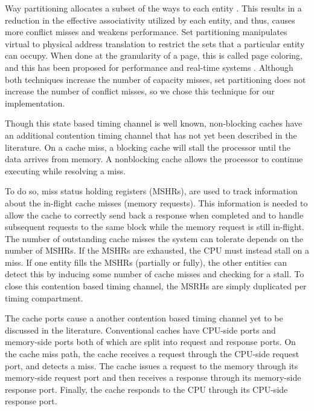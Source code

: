 Way partitioning allocates a subset of the ways to each entity 
\cite{citation_needed}. This results in a reduction in the effective 
associativity utilized by each entity, and thus, causes more conflict misses 
and weakens performance. Set partitioning manipulates virtual to physical 
address translation to restrict the sets that a particular entity can occupy.  
When done at the granularity of a page, this is called page coloring, and this 
has been proposed for performance \cite{citation_needed} and real-time systems 
\cite{rtas_cache_framework}.  Although both techniques increase the number of 
capacity misses, set partitioning does not increase the number of conflict 
misses, so we chose this technique for our implementation.

Though this state based timing channel is well known, non-blocking caches have 
an additional contention timing channel that has not yet been described in the 
literature. On a cache miss, a blocking cache will stall the processor until 
the data arrives from memory. A nonblocking cache allows the processor to 
continue executing while resolving a miss.

To do so, miss status holding registers (MSHRs), are used to track information 
about the in-flight cache misses (memory requests). This information is  needed 
to allow the cache to correctly send back a response when completed and to 
handle subsequent requests to the same block while the memory request is still 
in-flight.
The number of outstanding cache misses the system can tolerate depends on the 
number of MSHRs. If the MSHRs are exhausted, the CPU must instead stall on a 
miss. If one entity fills the MSHRs (partially or fully), the other entities 
can detect this by inducing some number of cache misses and checking for a 
stall. To close this contention based timing channel, the MSRHs are simply 
duplicated per timing compartment.

The cache ports cause a another contention based timing channel yet to be 
discussed in the literature. Conventional caches have CPU-side ports and 
memory-side ports both of which are split into request and response ports. On 
the cache miss path, the cache receives a request through the CPU-side request 
port, and detects a miss. The cache issues a request to the memory through its 
memory-side request port and then receives a response through its memory-side 
response port. Finally, the cache responds to the CPU through its CPU-side 
response port.

